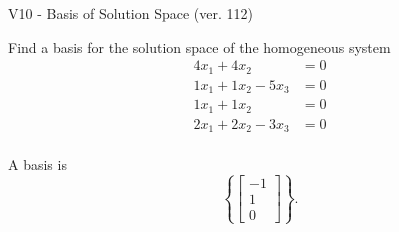 \begin{exercise}
  \begin{exerciseTitle}V10 - Basis of Solution Space (ver. 112)\end{exerciseTitle}
  \begin{exerciseStatement}
    Find a basis for the solution space of the homogeneous system 
\begin{align*}
 4 x_ 1 + 4 x_ 2 &= 0  \\ 
  1 x_ 1 + 1 x_ 2 -5 x_ 3 &= 0  \\ 
  1 x_ 1 + 1 x_ 2 &= 0  \\ 
  2 x_ 1 + 2 x_ 2 -3 x_ 3 &= 0  \\ 
 \end{align*}


 
  \end{exerciseStatement}

  \begin{exerciseAnswer}
   A basis is   
\[\left\{\left[\begin{array}{c}
-1 \\
1 \\
0
\end{array}\right]\right\}.\]

  


  \end{exerciseAnswer}
\end{exercise}